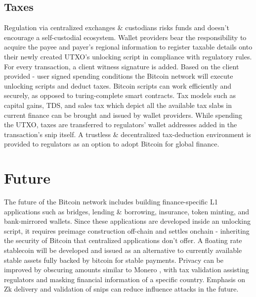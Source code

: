 \documentclass[a4paper, 10pt]{extarticle}
\begin{document}
\subsection{Taxes}
Regulation via centralized exchanges \& custodians risks funds and doesn't encourage a self-custodial ecosystem. Wallet providers bear the responsibility to acquire the payee and payer's regional information to register taxable details onto their newly created UTXO's unlocking script in compliance with regulatory rules. For every transaction, a client witness signature is added. Based on the client provided - user signed spending conditions the Bitcoin network will execute unlocking scripts and deduct taxes. Bitcoin scripts can work efficiently and securely, as opposed to turing-complete smart contracts. Tax models such as capital gains, TDS, and sales tax which depict all the available tax slabs in current finance can be brought and issued by wallet providers. While spending the UTXO, taxes are transferred to regulators' wallet addresses added in the transaction's snip itself. A trustless \& decentralized tax-deduction environment is provided to regulators as an option to adopt Bitcoin for global finance.
\section{Future}
The future of the Bitcoin network includes building finance-specific L1 applications such as bridges, lending \& borrowing, insurance, token minting, and bank-mirrored wallets. Since these applications are developed inside an unlocking script, it requires preimage construction off-chain and settles onchain - inheriting the security of Bitcoin that centralized applications don't offer. A floating rate stablecoin will be developed and issued as an alternative to currently available stable assets fully backed by bitcoin for stable payments. Privacy can be improved by obscuring amounts similar to Monero \cite{moneroct}, with tax validation assisting regulators and masking financial information of a specific country. Emphasis on Zk delivery and validation of snips can reduce influence attacks in the future.
\end{document}
